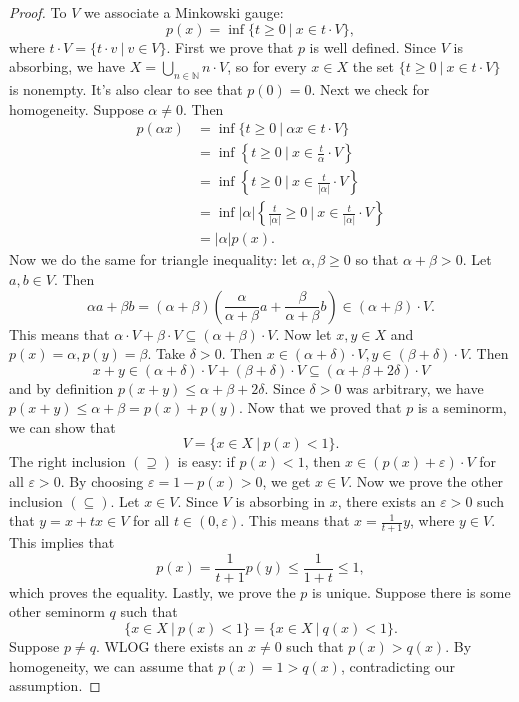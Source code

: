 \documentclass[10pt, a4paper]{article}
\newenvironment{noticeC}{%
  \tcolorbox[%
  notitle,
  empty,
  enhanced,  %
  breakable,
  coltext=black, 
  fontupper=\rmfamily,
  noparskip,
  sharp corners,
  boxrule=-1pt,  %
  frame hidden,
  left=7pt,  %
  right=7pt,
  top=5pt,
  bottom=5pt,
  before skip=2.5ex plus 2pt,
  after skip=2.5ex plus 2pt,
  overlay unbroken and last={%
  },
  ]}
{\endtcolorbox}
\newenvironment{myproof}%
  {\begin{noticeC}\begin{proof}}%
  {\end{proof}\end{noticeC}}
\newcommand{\N}{\mathbb {N}}
\begin{document}
\begin{myproof}
  To $V$ we associate a Minkowski gauge:
  $$p(x) = \inf \{t \geq 0\ |\ x \in t \cdot V\},$$
  where $t \cdot V = \{t \cdot v\ |\ v \in V\}$.
  First we prove that $p$ is well defined.
  Since $V$ is absorbing, we have $X = \bigcup_{n \in \N} n \cdot V$,
  so for every $x \in X$ the set $\{t \geq 0\ |\ x \in t \cdot V\}$
  is nonempty. It's also clear to see that $p(0) = 0$.
  Next we check for homogeneity. Suppose $\alpha \neq 0$.
  Then 
  \begin{align*}
    p(\alpha x) &= \inf \{t \geq 0\ |\ \alpha x \in t\cdot V\}\\
    &= \inf \left\lbrace t \geq 0\ |\ x \in \frac{t}{\alpha}\cdot V \right\rbrace\\
    &= \inf \left\lbrace t \geq 0\ |\ x \in \frac{t}{|\alpha|}\cdot V \right\rbrace\\
    &= \inf |\alpha| \left\lbrace \frac{t}{|\alpha|} \geq 0\ |\ x \in \frac{t}{|\alpha|}\cdot V \right\rbrace\\
    &= |\alpha| p(x).
  \end{align*}
  Now we do the same for triangle inequality:
  let $\alpha, \beta \geq 0$ so that $\alpha + \beta > 0$.
  Let $a, b \in V$. Then 
  $$\alpha a + \beta b = (\alpha + \beta) \left(\frac{\alpha}{\alpha + \beta} a + \frac{\beta}{\alpha + \beta} b\right) \in (\alpha + \beta) \cdot V.$$
  This means that $\alpha \cdot V + \beta \cdot V \subseteq (\alpha + \beta) \cdot V$.
  Now let $x, y \in X$ and $p(x) = \alpha, p(y) = \beta$.
  Take $\delta > 0$. Then $x \in (\alpha + \delta) \cdot V, y \in (\beta + \delta) \cdot V$.
  Then $$x + y \in (\alpha + \delta) \cdot V + (\beta + \delta) \cdot V \subseteq (\alpha + \beta + 2 \delta) \cdot V$$
  and by definition $p(x + y) \leq \alpha + \beta + 2 \delta$.
  Since $\delta > 0$ was arbitrary, we have $p(x + y) \leq \alpha + \beta = p(x) + p(y)$.
  Now that we proved that $p$ is a seminorm, we can show that 
  $$V = \{x \in X\ |\ p(x) < 1\}.$$
  The right inclusion $(\supseteq)$ is easy: if $p(x) < 1$, then $x \in (p(x) + \varepsilon) \cdot V$
  for all $\varepsilon > 0$. By choosing $\varepsilon = 1 - p(x) > 0$, we get $x \in V$.
  Now we prove the other inclusion $(\subseteq)$. Let $x \in V$.
  Since $V$ is absorbing in $x$, there exists an $\varepsilon > 0$ such that 
  $y = x + tx \in V$ for all $t \in (0, \varepsilon)$. This means that $x = \frac{1}{t + 1} y$, where $y \in V$.
  This implies that 
  $$p(x) = \frac{1}{t + 1} p(y) \leq \frac{1}{1 + t} \leq 1,$$
  which proves the equality. Lastly, we prove the $p$ is unique.
  Suppose there is some other seminorm $q$ such that 
  $$\{x \in X\ |\ p(x) < 1\} = \{x \in X\ |\ q(x) < 1\}.$$
  Suppose $p \neq q$. WLOG there exists an $x \neq 0$ such that $p(x) > q(x)$.
  By homogeneity, we can assume that $p(x) = 1 > q(x)$, contradicting our assumption.
\end{myproof}
\end{document}
